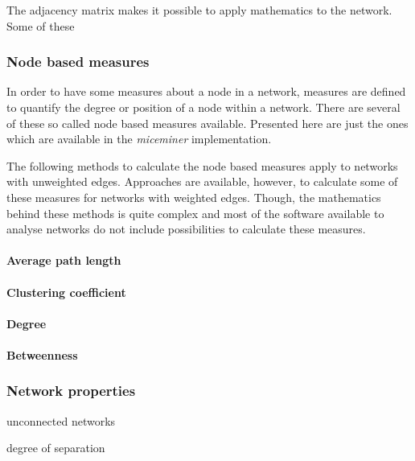 The adjacency matrix makes it possible to apply mathematics to the network. Some of these    

\subsubsection{Node based measures}
\label{subsubsec:node_based}

In order to have some measures about a node in a network, measures are defined to quantify the degree or position of a node within a network. There are several of these so called node based measures available. Presented here are just the ones which are available in the \textit{miceminer} implementation.

The following methods to calculate the node based measures apply to networks with unweighted edges. Approaches are available, however, to calculate some of these measures for networks with weighted edges. Though, the mathematics behind these methods is quite complex and most of the software available to analyse networks do not include possibilities to calculate these measures.  

\paragraph{Average path length}

\paragraph{Clustering coefficient}

\paragraph{Degree}

\paragraph{Betweenness}

\subsubsection{Network properties}
\label{subsubsec:topology}

\begin{mylist}
  \item unconnected networks
  \item degree of separation 
\end{mylist}

